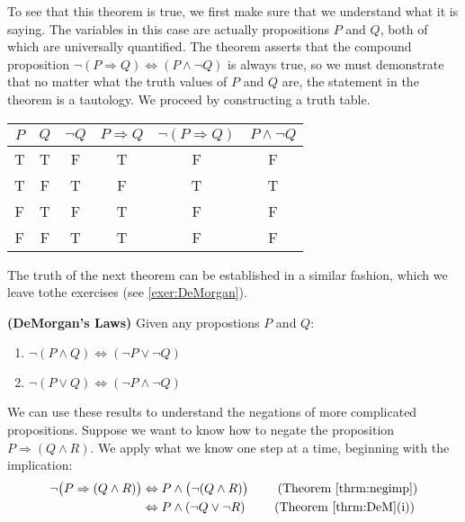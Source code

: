 To see that this theorem is true, we first make sure that we understand what it is saying. The variables in this case are actually propositions $P$ and $Q$, both of which are universally quantified. The theorem asserts that the compound proposition $\neg(P\Rightarrow Q)\Leftrightarrow (P\land\neg Q)$ is always true, so we must demonstrate that no matter what the truth values of $P$ and $Q$ are, the statement in the theorem is a tautology. We proceed by constructing a truth table.

\begin{center}
\begin{tabular}[t]{|c|c|c|c|c|c|}
\hline
$P$ & $Q$ & $\neg Q$ & $P\Rightarrow Q$ & $ \neg(P\Rightarrow Q)$ & $P\land \neg Q$ \\
\hline
T & T & F & T & F & F \\
\hline
T & F & T & F & T & T \\
\hline
F & T & F & T & F & F \\
\hline
F & F & T & T & F & F \\
\hline
\end{tabular}
\end{center}

The truth of the next theorem can be established in a similar fashion, which we leave tothe exercises (see  \ref{exer:DeMorgan}). 

\begin{thrm}\label{thrm:DeM}
{\bfseries\upshape (DeMorgan's Laws)} 
Given any propostions $P$ and $Q$:
\begin{enumerate}
\item $\neg (P\land Q)\Leftrightarrow (\neg P\lor\neg Q)$
\item $\neg (P\lor Q)\Leftrightarrow (\neg P\land\neg Q)$
\end{enumerate}
\end{thrm}

We can use these results to understand the negations of more complicated propositions. Suppose we want to know how to negate the proposition $P\Rightarrow(Q\land R)$. We apply what we know one step at a time, beginning with the implication:
\begin{equation*}
\begin{split}
\neg \bigl(  P\Rightarrow (Q\land R)\bigr) &\Leftrightarrow P\land\bigl( \neg(Q\land R)\bigr) \qquad\text{ (Theorem \ref{thrm:negimp})}\\
&\Leftrightarrow P\land (\neg Q \lor \neg R) \qquad\text{ (Theorem \ref{thrm:DeM}(i))}\\
\end{split}
\end{equation*}


